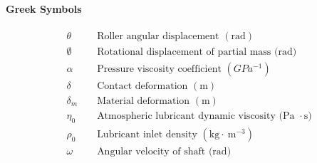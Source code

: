 \paragraph{Greek Symbols}
\begin{align*}
	&\theta && \text { Roller angular displacement }(\mathrm{rad}) \\
	&\emptyset && \text { Rotational displacement of partial mass (rad) } \\
	&\alpha && \text { Pressure viscosity coefficient }\left(GPa^{-1}\right) \\
	&\delta && \text { Contact deformation }(\mathrm{m}) \\
	&\delta_m && \text { Material deformation }(\mathrm{m}) \\
	&\eta_0 && \text { Atmospheric lubricant dynamic viscosity (Pa } \cdot \mathrm{s}) \\
	&\rho_0 && \text { Lubricant inlet density }\left(\mathrm{kg} \cdot \mathrm{~m}^{-3}\right) \\
	&\omega && \text { Angular velocity of shaft (rad) }
\end{align*}


